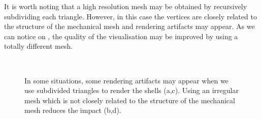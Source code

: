 It is worth noting that a high resolution mesh may be obtained by recursively subdividing each triangle. However, in this case the vertices are closely related to the structure of the mechanical mesh and rendering artifacts may appear. As we can notice on , the quality of the visualisation may be improved by using a totally different mesh.
%
\begin{figure}[ht]
\centering 
{}
\hspace{1cm}
 \\
\hspace{1cm}
\caption[Visual artifacts using triangle subdivisions]{In some situations, some rendering artifacts may appear when we use subdivided triangles to render the shells (a,c). Using an irregular mesh which is not closely related to the structure of the mechanical mesh reduces the impact (b,d).}
\label{chap9:fig-rendering}
\end{figure}


